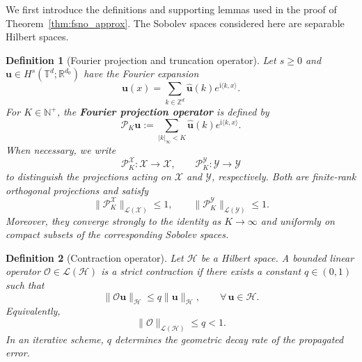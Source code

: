 \documentclass[preprint,numbers,sort&compress]{elsarticle}
\newtheorem{definition}{Definition}
\begin{document}
			We first introduce the definitions and supporting lemmas used in the proof of Theorem~\ref{thm:fsno_approx}. The Sobolev spaces considered here are separable Hilbert spaces.
			\begin{definition}[Fourier projection and truncation operator]
				Let $s \ge 0$ and
				$\boldsymbol u\in H^s(\mathbb T^d;\mathbb R^{d_{0}})$ have
				the Fourier expansion
				\[
				\boldsymbol u(x)
				=
				\sum_{k\in\mathbb Z^d}
				\widehat{\boldsymbol u}(k)e^{\mathrm{i}\langle k,x\rangle}.
				\]
				For $K\in\mathbb N^+$, the \textbf{Fourier projection operator} is defined by
				\[
				\mathcal P_K\boldsymbol u
				:=
				\sum_{\lvert k\rvert_\infty<K}
				\widehat{\boldsymbol u}(k)e^{\mathrm{i}\langle k,x\rangle}.
				\]
				When necessary, we write
				\[
				\mathcal P_K^{\mathcal X}:\mathcal X\to\mathcal X,
				\qquad
				\mathcal P_K^{\mathcal Y}:\mathcal Y\to\mathcal Y
				\]
				to distinguish the projections acting on $\mathcal X$ and $\mathcal Y$, respectively.
				Both are finite-rank orthogonal projections and satisfy
				\[
				\|\mathcal P_K^{\mathcal X}\|_{\mathcal L(\mathcal X)}
				\leq 1,
				\qquad
				\|\mathcal P_K^{\mathcal Y}\|_{\mathcal L(\mathcal Y)}
				\leq 1.
				\]
				Moreover, they converge strongly to the identity as $K\to\infty$ and
				uniformly on compact subsets of the corresponding Sobolev spaces.
				
				
			\end{definition}
			
			\begin{definition}[Contraction operator]
				Let $\mathcal H$ be a Hilbert space. A bounded linear operator
				$\mathcal O\in\mathcal L(\mathcal H)$ is a strict contraction if there exists a constant $q\in(0,1)$ such that
				\[
				\|\mathcal O\boldsymbol u\|_{\mathcal H}
				\leq
				q\|\boldsymbol u\|_{\mathcal H},
				\qquad
				\forall\,\boldsymbol u\in\mathcal H.
				\]
				Equivalently,
				\[
				\|\mathcal O\|_{\mathcal L(\mathcal H)}
				\leq q<1.
				\]
				In an iterative scheme, $q$ determines the geometric decay rate of the propagated error.
			\end{definition}
			
\end{document}
